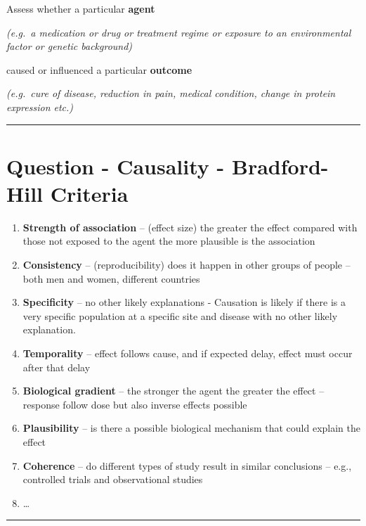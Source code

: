 \documentclass[]{article}
\providecommand{\tightlist}{%
  \setlength{\itemsep}{0pt}\setlength{\parskip}{0pt}}
\begin{document}
Assess whether a particular \textbf{agent}

\emph{(e.g.~a medication or drug or treatment regime or exposure to an
environmental factor or genetic background)}

caused or influenced a particular \textbf{outcome}

\emph{(e.g.~cure of disease, reduction in pain, medical condition,
change in protein expression etc.)}

\begin{center}\rule{0.5\linewidth}{\linethickness}\end{center}

\hypertarget{question---causality---bradford-hill-criteria}{%
\section{Question - Causality - Bradford-Hill
Criteria}\label{question---causality---bradford-hill-criteria}}

\begin{enumerate}
\def\labelenumi{\arabic{enumi}.}
\tightlist
\item
  \textbf{Strength of association} -- (effect size) the greater the
  effect compared with those not exposed to the agent the more plausible
  is the association
\item
  \textbf{Consistency} -- (reproducibility) does it happen in other
  groups of people -- both men and women, different countries
\item
  \textbf{Specificity} -- no other likely explanations - Causation is
  likely if there is a very specific population at a specific site and
  disease with no other likely explanation.
\item
  \textbf{Temporality} -- effect follows cause, and if expected delay,
  effect must occur after that delay
\item
  \textbf{Biological gradient} -- the stronger the agent the greater the
  effect -- response follow dose but also inverse effects possible
\item
  \textbf{Plausibility} -- is there a possible biological mechanism that
  could explain the effect
\item
  \textbf{Coherence} -- do different types of study result in similar
  conclusions -- e.g., controlled trials and observational studies
\item
  \ldots{} 
\end{enumerate}

\begin{center}\rule{0.5\linewidth}{\linethickness}\end{center}
\end{document}
